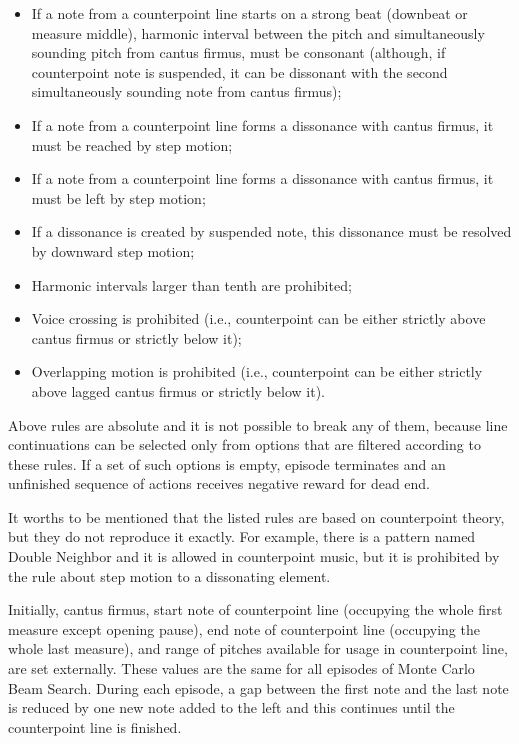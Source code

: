 \documentclass{article}
\begin{document}
\begin{itemize}
	\item If a note from a counterpoint line starts on a strong beat (downbeat or measure middle), harmonic interval between the pitch and simultaneously sounding pitch from cantus firmus, must be consonant (although, if counterpoint note is suspended, it can be dissonant with the second simultaneously sounding note from cantus firmus);
	\item If a note from a counterpoint line forms a dissonance with cantus firmus, it must be reached by step motion;
	\item If a note from a counterpoint line forms a dissonance with cantus firmus, it must be left by step motion;
	\item If a dissonance is created by suspended note, this dissonance must be resolved by downward step motion;
	\item Harmonic intervals larger than tenth are prohibited;
	\item Voice crossing is prohibited (i.e., counterpoint can be either strictly above cantus firmus or strictly below it);
	\item Overlapping motion is prohibited (i.e., counterpoint can be either strictly above lagged cantus firmus or strictly below it).
\end{itemize}

Above rules are absolute and it is not possible to break any of them, because line continuations can be selected only from options that are filtered according to these rules. If a set of such options is empty, episode terminates and an unfinished sequence of actions receives negative reward for dead end.

It worths to be mentioned that the listed rules are based on counterpoint theory, but they do not reproduce it exactly. For example, there is a pattern named Double Neighbor and it is allowed in counterpoint music, but it is prohibited by the rule about step motion to a dissonating element.

Initially, cantus firmus, start note of counterpoint line (occupying the whole first measure except opening pause), end note of counterpoint line (occupying the whole last measure), and range of pitches available for usage in counterpoint line, are set externally. These values are the same for all episodes of Monte Carlo Beam Search. During each episode, a gap between the first note and the last note is reduced by one new note added to the left and this continues until the counterpoint line is finished.
\end{document}
